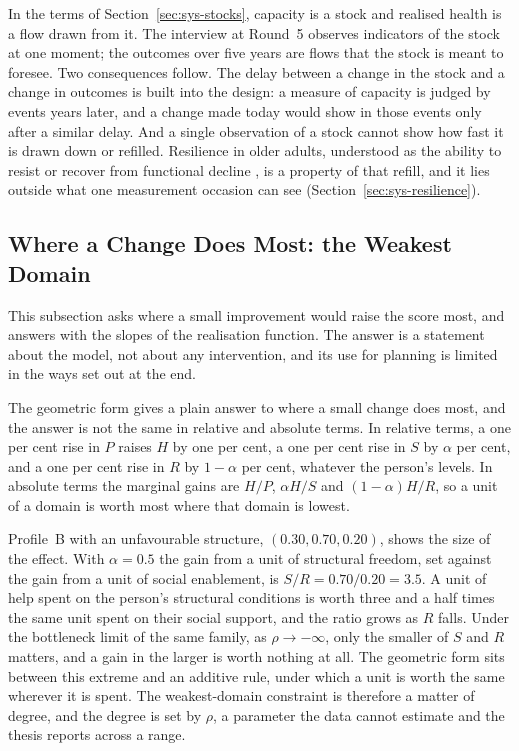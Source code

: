 In the terms of Section~\ref{sec:sys-stocks}, capacity is a stock and realised
health is a flow drawn from it. The interview at Round~5 observes indicators of the
stock at one moment; the outcomes over five years are flows that the stock is meant
to foresee. Two consequences follow. The delay between a change in the stock and a
change in outcomes is built into the design: a measure of capacity is judged by
events years later, and a change made today would show in those events only after a
similar delay. And a single observation of a stock cannot show how fast it is drawn
down or refilled. Resilience in older adults, understood as the ability to resist or
recover from functional decline \citep{whitson_2016}, is a property of that refill,
and it lies outside what one measurement occasion can see
(Section~\ref{sec:sys-resilience}).

\subsection{Where a Change Does Most: the Weakest Domain}
\label{sec:disc-sys-weakest}

This subsection asks where a small improvement would raise the score most, and
answers with the slopes of the realisation function. The answer is a statement
about the model, not about any intervention, and its use for planning is limited
in the ways set out at the end.

The geometric form gives a plain answer to where a small change does most, and the
answer is not the same in relative and absolute terms. In relative terms, a one per
cent rise in $P$ raises $H$ by one per cent, a one per cent rise in $S$ by $\alpha$
per cent, and a one per cent rise in $R$ by $1-\alpha$ per cent, whatever the
person's levels. In absolute terms the marginal gains are $H/P$, $\alpha H/S$ and
$(1-\alpha)H/R$, so a unit of a domain is worth most where that domain is lowest.

Profile~B with an unfavourable structure, $(0.30,0.70,0.20)$, shows the size of
the effect. With $\alpha=0.5$ the gain from a unit of structural freedom, set
against the gain from a unit of social enablement, is $S/R=0.70/0.20=3.5$. A unit
of help spent on the person's structural conditions is worth three and a half times
the same unit spent on their social support, and the ratio grows as $R$ falls.
Under the bottleneck limit of the same family, as $\rho\to-\infty$, only the
smaller of $S$ and $R$ matters, and a gain in the larger is worth nothing at all. The
geometric form sits between this extreme and an additive rule, under which a unit is
worth the same wherever it is spent. The weakest-domain constraint is therefore a
matter of degree, and the degree is set by $\rho$, a parameter the data cannot
estimate and the thesis reports across a range.

